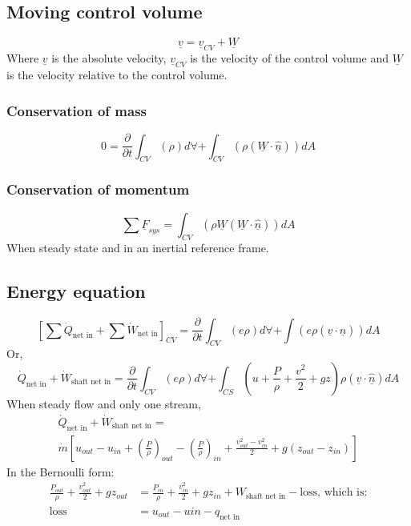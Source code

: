\documentclass[class=report, crop=false, 12pt,a4paper]{standalone}
\begin{document}
\subsection{Moving control volume}
\[ \underline{v} = \underline{v}_{CV} + \underline{W} \]
Where \( \underline{v} \) is the absolute velocity, \( \underline{v}_{CV} \) is the velocity of the control volume and \( \underline{W} \) is the velocity relative to the control volume.
\subsubsection{Conservation of mass}
\[ 0 = \frac{\partial}{\partial t}\int_{CV} \left( \rho \right) d\forall + \int_{CV} \left( \rho (\underline{W} \cdot \underline{\hat{n}}) \right) dA \]
\subsubsection{Conservation of momentum}
\[ \sum \underline{F}_{sys} = \int_{CV} \left( \rho \underline{W} (\underline{W} \cdot \underline{\hat{n}}) \right) dA \]
When steady state and in an inertial reference frame.
\subsection{Energy equation}
\[ \left[ \sum \dot{Q}_{\textrm{net in}} + \sum \dot{W}_{\textrm{net in}} \right]_{CV} = \frac{\partial}{\partial t} \int_{CV} \left( e \rho \right) d \forall + \int \left( e \rho (\underline{v} \cdot \underline{\hat{n}}) \right) dA \]
Or,
\[ \dot{Q}_{\textrm{net in}} + \dot{W}_{\textrm{shaft net in}} =\frac{\partial}{\partial t} \int_{CV} \left( e \rho \right) d \forall + \int_{CS} \left( u + \frac{P}{\rho} + \frac{v^2}{2} + gz \right) \rho (\underline{v} \cdot \underline{\hat{n}}) dA \]
When steady flow and only one stream,
\begin{multline*}
  \dot{Q}_{\textrm{net in}} + \dot{W}_{\textrm{shaft net in}} =\\ \dot{m} \left[ u_{out} - u_{in} + \left( \frac{P}{\rho} \right)_{out} - \left( \frac{P}{\rho} \right)_{in} + \frac{v_{out}^2 - v_{in}^2}{2} + g(z_{out}- z_{in})  \right]
\end{multline*}
In the Bernoulli form:
\begin{align*}
  \frac{P_{out}}{\rho} + \frac{v_{out}^2}{2} + gz_{out} &= \frac{P_{in}}{\rho} + \frac{v_{in}^2}{2} + gz_{in} + W_{\textrm{shaft net in}} - \textrm{loss, which is:}\\
  \textrm{loss} &= u_{out} - u{in} - q_{\textrm{net in}}
\end{align*}
\end{document}
